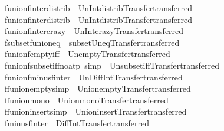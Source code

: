 \begin{isabellebody}
\isamarkupfalse%
\ funion{\isacharunderscore}finter{\isacharunderscore}distrib\ {\isacharequal}\ Un{\isacharunderscore}Int{\isacharunderscore}distrib{\isacharbrackleft}Transfer{\isachardot}transferred{\isacharbrackright}\isanewline
{}\isamarkupfalse%
\ funion{\isacharunderscore}finter{\isacharunderscore}distrib{}\ {\isacharequal}\ Un{\isacharunderscore}Int{\isacharunderscore}distrib{}{\isacharbrackleft}Transfer{\isachardot}transferred{\isacharbrackright}\isanewline
{}\isamarkupfalse%
\ funion{\isacharunderscore}finter{\isacharunderscore}crazy\ {\isacharequal}\ Un{\isacharunderscore}Int{\isacharunderscore}crazy{\isacharbrackleft}Transfer{\isachardot}transferred{\isacharbrackright}\isanewline
{}\isamarkupfalse%
\ fsubset{\isacharunderscore}funion{\isacharunderscore}eq\ {\isacharequal}\ subset{\isacharunderscore}Un{\isacharunderscore}eq{\isacharbrackleft}Transfer{\isachardot}transferred{\isacharbrackright}\isanewline
{}\isamarkupfalse%
\ funion{\isacharunderscore}fempty{\isacharbrackleft}iff{\isacharbrackright}\ {\isacharequal}\ Un{\isacharunderscore}empty{\isacharbrackleft}Transfer{\isachardot}transferred{\isacharbrackright}\isanewline
{}\isamarkupfalse%
\ funion{\isacharunderscore}fsubset{\isacharunderscore}iff{\isacharbrackleft}no{\isacharunderscore}atp{\isacharcomma}\ simp{\isacharbrackright}\ {\isacharequal}\ Un{\isacharunderscore}subset{\isacharunderscore}iff{\isacharbrackleft}Transfer{\isachardot}transferred{\isacharbrackright}\isanewline
{}\isamarkupfalse%
\ funion{\isacharunderscore}fminus{\isacharunderscore}finter\ {\isacharequal}\ Un{\isacharunderscore}Diff{\isacharunderscore}Int{\isacharbrackleft}Transfer{\isachardot}transferred{\isacharbrackright}\isanewline
{}\isamarkupfalse%
\ ffunion{\isacharunderscore}empty{\isacharbrackleft}simp{\isacharbrackright}\ {\isacharequal}\ Union{\isacharunderscore}empty{\isacharbrackleft}Transfer{\isachardot}transferred{\isacharbrackright}\isanewline
{}\isamarkupfalse%
\ ffunion{\isacharunderscore}mono\ {\isacharequal}\ Union{\isacharunderscore}mono{\isacharbrackleft}Transfer{\isachardot}transferred{\isacharbrackright}\isanewline
{}\isamarkupfalse%
\ ffunion{\isacharunderscore}insert{\isacharbrackleft}simp{\isacharbrackright}\ {\isacharequal}\ Union{\isacharunderscore}insert{\isacharbrackleft}Transfer{\isachardot}transferred{\isacharbrackright}\isanewline
{}\isamarkupfalse%
\ fminus{\isacharunderscore}finter{}\ {\isacharequal}\ Diff{\isacharunderscore}Int{}{\isacharbrackleft}Transfer{\isachardot}transferred{\isacharbrackright}\isanewline

\end{isabellebody}
